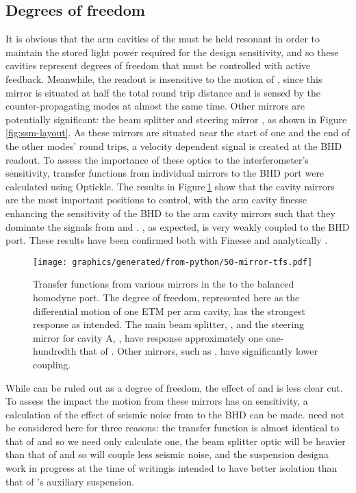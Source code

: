 \subsection{\label{sec:ssm-dofs}Degrees of freedom}
It is obvious that the arm cavities of the \SSM{} must be held resonant in order to maintain the  stored light power required for the design sensitivity, and so these cavities represent degrees of freedom that must be controlled with active feedback. Meanwhile, the readout is insensitive to the motion of \MINT{}, since this mirror is situated at half the total round trip distance and is sensed by the counter-propagating modes at almost the same time. Other mirrors are potentially significant: the beam splitter \MSIX{} and steering mirror \MSEVEN{}, as shown in Figure\,\ref{fig:ssm-layout}. As these mirrors are situated near the start of one and the end of the other modes' round trips, a velocity dependent signal is created at the \gls{BHD} readout. To assess the importance of these optics to the interferometer's \LMINUS{} sensitivity, transfer functions from individual mirrors to the \gls{BHD} port were calculated using Optickle. The results in Figure\,\ref{fig:ssm-mirror-tfs} show that the cavity mirrors are the most important positions to control, with the arm cavity finesse enhancing the sensitivity of the \gls{BHD} to the arm cavity mirrors such that they dominate the signals from \MSIX{} and \MSEVEN{}. \MINT{}, as expected, is very weakly coupled to the \gls{BHD} port. These results have been confirmed both with Finesse and analytically \cite{Graefke2015}.

\begin{figure}
  \centering
  \texttt{[image: graphics/generated/from-python/50-mirror-tfs.pdf]}
  \caption[Transfer functions from various mirrors in the \SSMEXPT{} to the balanced homodyne port]{\label{fig:ssm-mirror-tfs}Transfer functions from various mirrors in the \SSMEXPT{} to the balanced homodyne port. The \LMINUS{} degree of freedom, represented here as the differential motion of one ETM per arm cavity, has the strongest response as intended. The main beam splitter, \MSIX{}, and the steering mirror for cavity A, \MSEVEN{}, have response approximately one one-hundredth that of \LMINUS{}. Other mirrors, such as \MINT{}, have significantly lower coupling.}
\end{figure}

While \MINT{} can be ruled out as a degree of freedom, the effect of \MSIX{} and \MSEVEN{} is less clear cut. To assess the impact the motion from these mirrors has on \LMINUS{} sensitivity, a calculation of the effect of seismic noise from \MSEVEN{} to the \gls{BHD} can be made. \MSIX{} need not be considered here for three reasons: the transfer function is almost identical to that of \MSEVEN{} and so we need only calculate one, the beam splitter optic will be heavier than that of \MSEVEN{} and so will couple less seismic noise, and the suspension design\textemdash a work in progress at the time of writing\textemdash is intended to have better isolation than that of \MSEVEN{}'s auxiliary suspension.

